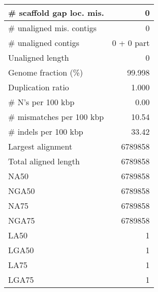 \documentclass[12pt,a4paper]{article}
\begin{document}
\begin{table}[ht]
\begin{center}
\begin{tabular}{|l*{1}{|r}|}
\# scaffold gap loc. mis. & 0 \\ \hline
\# unaligned mis. contigs & 0 \\ \hline
\# unaligned contigs & 0 + 0 part \\ \hline
Unaligned length & 0 \\ \hline
Genome fraction (\%) & 99.998 \\ \hline
Duplication ratio & 1.000 \\ \hline
\# N's per 100 kbp & 0.00 \\ \hline
\# mismatches per 100 kbp & 10.54 \\ \hline
\# indels per 100 kbp & 33.42 \\ \hline
Largest alignment & 6789858 \\ \hline
Total aligned length & 6789858 \\ \hline
NA50 & 6789858 \\ \hline
NGA50 & 6789858 \\ \hline
NA75 & 6789858 \\ \hline
NGA75 & 6789858 \\ \hline
LA50 & 1 \\ \hline
LGA50 & 1 \\ \hline
LA75 & 1 \\ \hline
LGA75 & 1 \\ \hline
\end{tabular}
\end{center}
\end{table}
\end{document}
